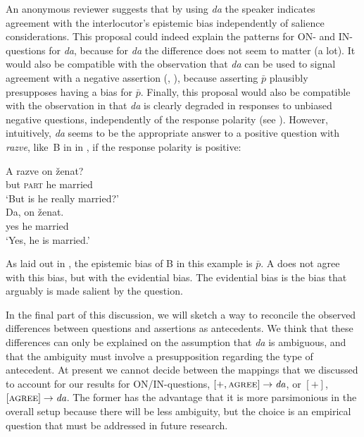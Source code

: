 \documentclass[output=paper,colorlinks,citecolor=brown]{langscibook}
\begin{document}
An anonymous reviewer suggests that by using \textit{da} the speaker indicates agreement with the interlocutor’s epistemic bias independently of salience considerations. This proposal could indeed explain the patterns for ON- and IN-questions for \textit{da}, because for \textit{da} the difference does not seem to matter (a lot). It would also be compatible with the observation that \textit{da} can be used to signal agreement with a negative assertion (\citealt{Esipova2021}, \citealt{ReppGeist2022}), because asserting $\bar{p}$  plausibly presupposes having a bias for $\bar{p}$. Finally, this proposal would also be compatible with the observation in \citet{ReppGeist2022} that \textit{da} is clearly degraded in responses to unbiased negative questions, independently of the response polarity (see ). However, intuitively, \textit{da} seems to be the appropriate answer to a positive question with \textit{razve}, like~B in  in , if the response polarity is positive:

\ea\label{geist-repp:ex:he-married}
\begin{xlist}[M:]
     \gll A 	razve	on	ženat?\\
but 	\textsc{part}	he	married \\
\glt ‘But is he really married?’ \\
     \gll Da,	 on	ženat.\\
yes	he	married\\
\glt ‘Yes, he is married.’ \\ 
\end{xlist}
\z

\noindent As laid out in , the epistemic bias of B in this example is $\bar{p}$. A does not agree with this bias, but with the evidential bias. The evidential bias is the bias that arguably is made salient by the question. 

In the final part of this discussion, we will sketch a way to reconcile the observed differences between questions and assertions as antecedents. We think that these differences can only be explained on the assumption that \textit{da} is ambiguous, and that the ambiguity must involve a presupposition regarding the type of antecedent. At present we cannot decide between the mappings that we discussed to account for our results for ON/IN-questions, $[+,\textsc{agree}]\rightarrow\textit{da}$, or $[+]$, $[\textsc{agree}]\rightarrow\textit{da}$. The former has the advantage that it is more parsimonious in the overall setup because there will be less ambiguity, but the choice is an empirical question that must be addressed in future research. 
\end{document}
